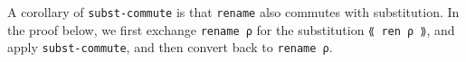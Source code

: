 A corollary of \texttt{subst-commute} is that \texttt{rename} also
commutes with substitution. In the proof below, we first exchange
\texttt{rename\ ρ} for the substitution \texttt{⟪\ ren\ ρ\ ⟫}, and apply
\texttt{subst-commute}, and then convert back to \texttt{rename\ ρ}.

\begin{fence}
\begin{code}%
\>[0]\AgdaSpace{}%
\AgdaSymbol{:}\AgdaSpace{}%
\AgdaSpace{}%
\AgdaSymbol{\}\{}\AgdaSpace{}%
\AgdaSymbol{:}\AgdaSpace{}%
\AgdaSpace{}%
\AgdaOperator{\AgdaInductiveConstructor{,}}\AgdaSpace{}%
\AgdaSpace{}%
\AgdaSpace{}%
\AgdaSymbol{\}\{}\AgdaSpace{}%
\AgdaSymbol{:}\AgdaSpace{}%
\AgdaSpace{}%
\AgdaSpace{}%
\AgdaSymbol{\}\{}\AgdaSpace{}%
\AgdaSymbol{:}\AgdaSpace{}%
\AgdaSpace{}%
\AgdaSpace{}%
\AgdaSpace{}%
\AgdaSymbol{\}}\<%
\\
\>[0][@{}l@{\AgdaIndent{0}}]%
\>[4]\AgdaSpace{}%
\AgdaSymbol{(}\AgdaSpace{}%
\AgdaSymbol{(}\AgdaSpace{}%
\AgdaSymbol{)}\AgdaSpace{}%
\AgdaSymbol{)}\AgdaSpace{}%
\AgdaOperator{\AgdaFunction{[}}\AgdaSpace{}%
\AgdaSpace{}%
\AgdaSpace{}%
\AgdaSpace{}%
\AgdaOperator{\AgdaFunction{]}}\AgdaSpace{}%
\AgdaSpace{}%
\AgdaSpace{}%
\AgdaSpace{}%
\AgdaSymbol{(}\AgdaSpace{}%
\AgdaOperator{\AgdaFunction{[}}\AgdaSpace{}%
\AgdaSpace{}%
\AgdaOperator{\AgdaFunction{]}}\AgdaSymbol{)}\<%
\\
\>[0]\AgdaSpace{}%
\AgdaSymbol{\{}\AgdaSymbol{\}\{}\AgdaSymbol{\}\{}\AgdaSymbol{\}\{}\AgdaSymbol{\}\{}\AgdaSymbol{\}}\AgdaSpace{}%
\AgdaSymbol{=}\<%
\\
\>[0][@{}l@{\AgdaIndent{0}}]%
\>[5]\<%
\\
\>[5][@{}l@{\AgdaIndent{0}}]%
\>[7]\AgdaSymbol{(}\AgdaSpace{}%
\AgdaSymbol{(}\AgdaSpace{}%
\AgdaSymbol{)}\AgdaSpace{}%
\AgdaSymbol{)}\AgdaSpace{}%
\AgdaOperator{\AgdaFunction{[}}\AgdaSpace{}%

\end{code}
\end{fence}
